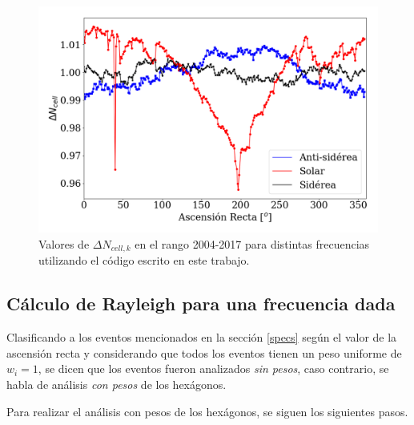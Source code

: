        \begin{figure}[H]
          \centering
              \includegraphics[width=0.75\linewidth]{weigths_2020.png}
              \caption{Valores de $\Delta N_{cell, k}$ en el rango 2004-2017 para distintas frecuencias utilizando el código escrito en este trabajo.}
              \label{fig:pesos_ejemplo}
        \end{figure}



  \subsection{Cálculo de Rayleigh para una frecuencia dada} \label{rayleigh}


Clasificando a los eventos mencionados en la sección \ref{specs} según el valor de la ascensión recta y considerando que todos los eventos tienen un peso uniforme de $w_i=1$, se dicen que los eventos fueron analizados \textit{sin pesos}, caso contrario, se habla de análisis \textit{con pesos} de los hexágonos.

Para realizar el análisis con pesos de los hexágonos, se siguen los siguientes pasos.


